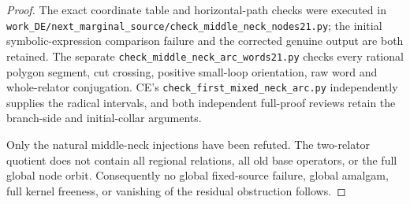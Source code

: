 \begin{proof}
The exact coordinate table and horizontal-path checks were
executed in
\texttt{work\_DE/next\_marginal\_source/check\_middle\_neck\_nodes21.py};
the initial symbolic-expression comparison failure and the
corrected genuine output are both retained. The separate
\texttt{check\_middle\_neck\_arc\_words21.py} checks every rational
polygon segment, cut crossing, positive small-loop orientation,
raw word and whole-relator conjugation. CE's
\texttt{check\_first\_mixed\_neck\_arc.py} independently supplies
the radical intervals, and both independent full-proof reviews
retain the branch-side and initial-collar arguments.

Only the natural middle-neck injections have been refuted.
The two-relator quotient does not contain all regional relations,
all old base operators, or the full global node orbit. Consequently
no global fixed-source failure, global amalgam, full kernel
freeness, or vanishing of the residual obstruction follows.
\end{proof}
